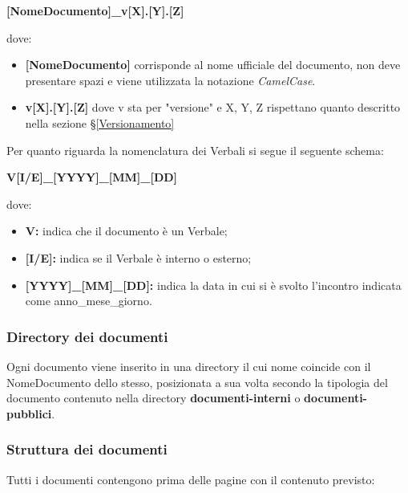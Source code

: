 \begin{center}
	\textbf{[NomeDocumento]\_v[X].[Y].[Z]}
\end{center}
dove:
\begin{itemize}
	\item \textbf{[NomeDocumento]} corrisponde al nome ufficiale del documento, non deve presentare spazi e viene utilizzata la notazione \textit{CamelCase}.
	\item \textbf{v[X].[Y].[Z]} dove v sta per "versione" e X, Y, Z rispettano quanto descritto nella sezione \S\ref{Versionamento}
\end{itemize}

Per quanto riguarda la nomenclatura dei Verbali si segue il seguente schema:
\begin{center}
	\textbf{V[I/E]\_[YYYY]\_[MM]\_[DD]}
\end{center}
dove:
\begin{itemize}
	\item \textbf{V: } indica che il documento è un Verbale;
	\item \textbf{[I/E]: } indica se il Verbale è interno o esterno;
	\item \textbf{[YYYY]\_[MM]\_[DD]: } indica la data in cui si è svolto l'incontro indicata come anno\_mese\_giorno.
\end{itemize}

\subsubsection{Directory dei documenti}
Ogni documento viene inserito in una directory il cui nome coincide con il NomeDocumento dello stesso, posizionata a sua volta secondo la tipologia del documento contenuto nella directory \textbf{documenti-interni} o \textbf{documenti-pubblici}.

\subsubsection{Struttura dei documenti}\label{Struttura documenti}
Tutti i documenti contengono prima delle pagine con il contenuto previsto:
